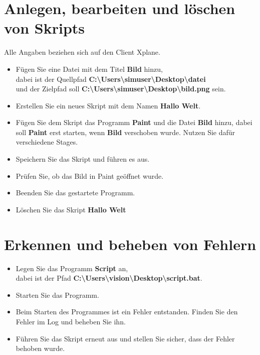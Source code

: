 \documentclass[accentcolor=tud1a,11pt]{tudexercise}
\begin{document}
\nutzerstudie
\section*{Anlegen, bearbeiten und löschen von Skripts}
Alle Angaben beziehen sich auf den Client Xplane.
\begin{itemize}
	\item Fügen Sie eine Datei mit dem Titel \textbf{Bild} hinzu, \\
		dabei ist der Quellpfad \textbf{C:\textbackslash Users\textbackslash simuser\textbackslash Desktop\textbackslash datei} \\ 
		und der Zielpfad soll \textbf{C:\textbackslash Users\textbackslash simuser\textbackslash Desktop\textbackslash bild.png} sein.
	\item Erstellen Sie ein neues Skript mit dem Namen \textbf{Hallo Welt}.
	\item Fügen Sie dem Skript das Programm \textbf{Paint} und die Datei \textbf{Bild} hinzu, dabei soll \textbf{Paint} erst starten, wenn \textbf{Bild} verschoben wurde. Nutzen Sie dafür verschiedene Stages.
	\item Speichern Sie das Skript und führen es aus.
	\item Prüfen Sie, ob das Bild in Paint geöffnet wurde.
	\item Beenden Sie das gestartete Programm.
	\item Löschen Sie das Skript \textbf{Hallo Welt}		
\end{itemize}
\section*{Erkennen und beheben von Fehlern}
\begin{itemize}
	\item Legen Sie das Programm \textbf{Script} an, \\
		dabei ist der Pfad \textbf{C:\textbackslash Users\textbackslash vision\textbackslash Desktop\textbackslash script.bat}.
	\item Starten Sie das Programm.
	\item Beim Starten des Programmes ist ein Fehler entstanden. Finden Sie den Fehler im Log und beheben Sie ihn.
	\item Führen Sie das Skript erneut aus und stellen Sie sicher, dass der Fehler behoben wurde.
\end{itemize}
\end{document}
